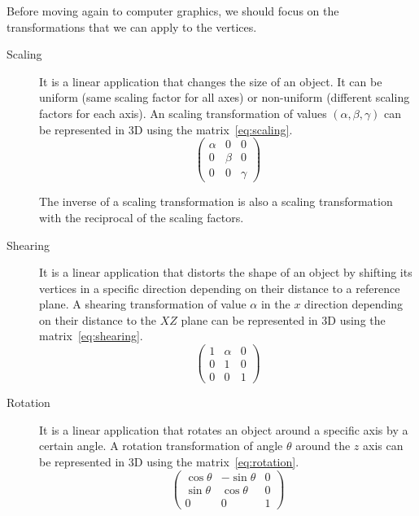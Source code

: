 Before moving again to computer graphics, we should focus on the transformations that we can apply to the vertices.
\begin{description}
    \item[Scaling]
        It is a linear application that changes the size of an object. It can be uniform (same scaling factor for all axes) or non-uniform (different scaling factors for each axis). An scaling transformation of values $(\alpha, \beta, \gamma)$ can be represented in 3D using the matrix~\eqref{eq:scaling}.
        \begin{equation}
            \begin{pmatrix}
                \alpha & 0 & 0\\
                0 & \beta & 0\\
                0 & 0 & \gamma
            \end{pmatrix}
            \label{eq:scaling}
        \end{equation}

        The inverse of a scaling transformation is also a scaling transformation with the reciprocal of the scaling factors.

    \item[Shearing]
        It is a linear application that distorts the shape of an object by shifting its vertices in a specific direction depending on their distance to a reference plane. A shearing transformation of value $\alpha$ in the $x$ direction depending on their distance to the $XZ$ plane can be represented in 3D using the matrix~\eqref{eq:shearing}.
        \begin{equation}
            \begin{pmatrix}
                1 & \alpha & 0\\
                0 & 1 & 0\\
                0 & 0 & 1
            \end{pmatrix}
            \label{eq:shearing}
        \end{equation}
    
    \item[Rotation] 
        It is a linear application that rotates an object around a specific axis by a certain angle. A rotation transformation of angle $\theta$ around the $z$ axis can be represented in 3D using the matrix~\eqref{eq:rotation}.
        \begin{equation}
            \begin{pmatrix}
                \cos\theta & -\sin\theta & 0\\
                \sin\theta & \cos\theta & 0\\
                0 & 0 & 1
            \end{pmatrix}
            \label{eq:rotation}
        \end{equation}


\end{description}
